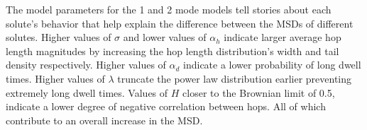 \documentclass{article}
\begin{document}
%  
  
  
  The model parameters for the 1 and 2 mode models tell stories about each solute's
  behavior that help explain the difference between the MSDs of different solutes. 
  Higher values of $\sigma$ and lower values of $\alpha_h$ indicate larger average 
  hop length magnitudes by increasing the hop length distribution's width and tail 
  density respectively. Higher values of $\alpha_d$ indicate a lower probability of 
  long dwell times. Higher values of $\lambda$ truncate the power law distribution 
  earlier preventing extremely long dwell times. Values of $H$ closer to the Brownian
  limit of 0.5, indicate a lower degree of negative correlation between hops. All 
  of which contribute to an overall increase in the MSD.
  
\end{document}
